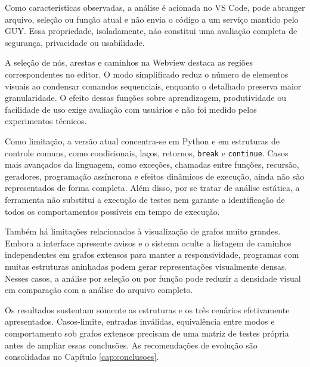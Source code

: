 Como características observadas, a análise é acionada no VS Code, pode abranger arquivo, seleção ou função atual e não envia o código a um serviço mantido pelo GUY. Essa propriedade, isoladamente, não constitui uma avaliação completa de segurança, privacidade ou usabilidade.

A seleção de nós, arestas e caminhos na Webview destaca as regiões correspondentes no editor. O modo simplificado reduz o número de elementos visuais ao condensar comandos sequenciais, enquanto o detalhado preserva maior granularidade. O efeito dessas funções sobre aprendizagem, produtividade ou facilidade de uso exige avaliação com usuários e não foi medido pelos experimentos técnicos.

Como limitação, a versão atual concentra-se em Python e em estruturas de controle comuns, como condicionais, laços, retornos, \texttt{break} e \texttt{continue}. Casos mais avançados da linguagem, como exceções, chamadas entre funções, recursão, geradores, programação assíncrona e efeitos dinâmicos de execução, ainda não são representados de forma completa. Além disso, por se tratar de análise estática, a ferramenta não substitui a execução de testes nem garante a identificação de todos os comportamentos possíveis em tempo de execução.

Também há limitações relacionadas à visualização de grafos muito grandes. Embora a interface apresente avisos e o sistema oculte a listagem de caminhos independentes em grafos extensos para manter a responsividade, programas com muitas estruturas aninhadas podem gerar representações visualmente densas. Nesses casos, a análise por seleção ou por função pode reduzir a densidade visual em comparação com a análise do arquivo completo.

Os resultados sustentam somente as estruturas e os três cenários efetivamente apresentados. Casos-limite, entradas inválidas, equivalência entre modos e comportamento sob grafos extensos precisam de uma matriz de testes própria antes de ampliar essas conclusões. As recomendações de evolução são consolidadas no Capítulo \ref{cap:conclusoes}.
